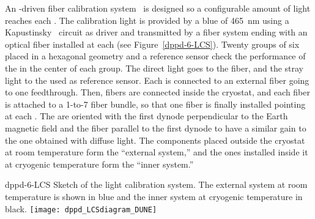 An -driven fiber calibration system~\cite{Cuesta:2017nrs,Conrad:2015xta,Caccianiga:2003fm,ADAMSON2002325,Belver:2019lqm} is designed so a configurable amount of light reaches each . The calibration light is provided by a blue  of \SI{465}{\nm} using a Kapustinsky~\cite{KAPUSTINSKY1985612} circuit as  driver and transmitted by a fiber system ending with an optical fiber installed at each  (see Figure~\ref{dppd-6-LCS}). Twenty groups of six  placed in a hexagonal geometry and a reference sensor check the performance of the  in the center of each group. The direct light goes to the fiber, and the stray light to the  used as reference sensor. Each  is connected to an external fiber going to one feedthrough. Then, fibers are connected inside the cryostat, and each fiber is attached to a 1-to-7 fiber bundle, so that one fiber is finally installed pointing at each . The  are oriented with the first dynode perpendicular to the Earth magnetic field and the fiber parallel to the first dynode to have a similar gain to the one obtained with diffuse light. The components placed outside the cryostat at room temperature form the ``external system,'' and the ones installed inside it at cryogenic temperature form the ``inner system.'' 


\begin{dunefigure}{dppd-6-LCS}
{Sketch of the    light calibration system. The external system at room temperature is shown in blue and the inner system at cryogenic temperature in black.}
\texttt{[image: dppd\_LCSdiagram\_DUNE]}
\end{dunefigure}


